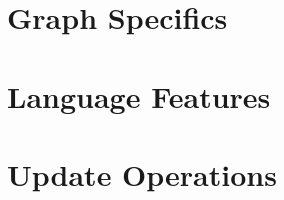 


\section{Graph Specifics}











\section{Language Features}









\section{Update Operations}





